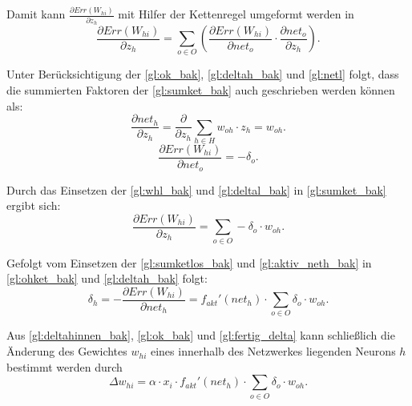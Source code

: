 Damit kann $\frac{\partial Err(W_{hi})}{\partial z_{h}}$ mit Hilfer der Kettenregel umgeformt werden in
\begin{equation}
\frac{\partial Err(W_{hi})}{\partial z_{h}} =\sum\limits_{o \in O} \left (  \frac{\partial Err(W_{hi})}{\partial net_{o}} \cdot \frac{\partial net_{o}}{\partial z_{h}} \right ).
\label{gl:sumket_bak}
\end{equation}

Unter Berücksichtigung der \autoref{gl:ok_bak}, \autoref{gl:deltah_bak} und \autoref{gl:netl} folgt, dass die summierten Faktoren der \autoref{gl:sumket_bak} auch geschrieben werden können als:
\begin{equation}
\frac{\partial net_{h}}{\partial z_{h}} = \frac{\partial }{\partial z_{h}} \sum\limits_{h \in H} w_{oh} \cdot z_{h} = w_{oh} .
\label{gl:whl_bak}
\end{equation}
\begin{equation}
\frac{\partial Err(W_{hi})}{\partial net_{o}} = -\delta_o .
\label{gl:deltal_bak}
\end{equation}

Durch das Einsetzen der \autoref{gl:whl_bak} und \autoref{gl:deltal_bak} in \autoref{gl:sumket_bak} ergibt sich:
\begin{equation}
\frac{\partial Err(W_{hi})}{\partial z_{h}} =\sum\limits_{o \in O}  -\delta_o \cdot w_{oh} .
\label{gl:sumketlos_bak}
\end{equation}

Gefolgt vom Einsetzen der \autoref{gl:sumketlos_bak} und \autoref{gl:aktiv_neth_bak} in \autoref{gl:ohket_bak} und \autoref{gl:deltah_bak} folgt:
\begin{equation}
\delta_{h}= -\frac{\partial Err(W_{hi})}{\partial net_{h}} = f_{akt}'(net_h) \cdot \sum\limits_{o \in O}  \delta_o \cdot w_{oh}.
\label{gl:deltahinnen_bak}
\end{equation}

Aus \autoref{gl:deltahinnen_bak}, \autoref{gl:ok_bak} und \autoref{gl:fertig_delta} kann schließlich die Änderung des Gewichtes $w_{hi}$ eines innerhalb des Netzwerkes liegenden Neurons $h$ bestimmt werden durch
\begin{equation}
\Delta w_{hi} = \alpha \cdot x_{i} \cdot f_{akt}'(net_h) \cdot \sum\limits_{o \in O}  \delta_o \cdot w_{oh}  .
\label{gl:fertiginnen_bak}
\end{equation}

